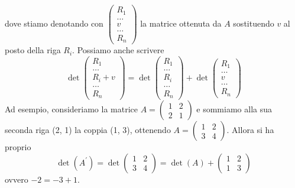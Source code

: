 \documentclass{book}
\begin{document}
\begin{enumerate}
  dove stiamo denotando con $\begin{pmatrix} R_1 \\ \dots \\ v\\ \dots \\ R_n \end{pmatrix}$ la matrice ottenuta da $A$ sostituendo $v$ al posto della riga $R_i$. Possiamo anche scrivere
  \begin{equation}
	\det\begin{pmatrix} R_1 \\ \dots \\ R_i+v\\ \dots \\ R_n \end{pmatrix}=\det\begin{pmatrix} R_1 \\ \dots \\ R_i\\ \dots \\ R_n \end{pmatrix}+\det \begin{pmatrix} R_1 \\ \dots \\ v\\ \dots \\ R_n \end{pmatrix}
  \end{equation}
  Ad esempio, consideriamo la matrice $A=\begin{pmatrix} 1 & 2 \\ 2 & 1 \end{pmatrix}$ e sommiamo
  alla sua seconda riga (2, 1) la coppia (1, 3), ottenendo  $A=\begin{pmatrix} 1 & 2 \\ 3 & 4 \end{pmatrix}$. Allora si ha proprio
  \begin{equation*}
	\det(A^\prime)=\det\begin{pmatrix} 1 & 2 \\ 3 & 4 \end{pmatrix}=\det(A)+\begin{pmatrix} 1 & 2 \\ 1 & 3 \end{pmatrix}
  \end{equation*}
  ovvero $-2=-3+1$.\\
  \fbox{
 	\addtolength{\linewidth}{-2\fboxsep}%
 	\addtolength{\linewidth}{-2\fboxrule}%
	\begin{minipage}{\linewidth}

\end{minipage}}
\end{enumerate}
\end{document}
